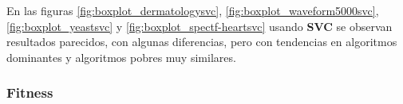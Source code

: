 En las figuras \ref{fig:boxplot_dermatologysvc}, \ref{fig:boxplot_waveform5000svc}, \ref{fig:boxplot_yeastsvc} y \ref{fig:boxplot_spectf-heartsvc} usando \textbf{SVC} se observan resultados parecidos, con algunas diferencias, pero con tendencias en algoritmos dominantes y algoritmos pobres muy similares.

\subsubsection{Fitness}
